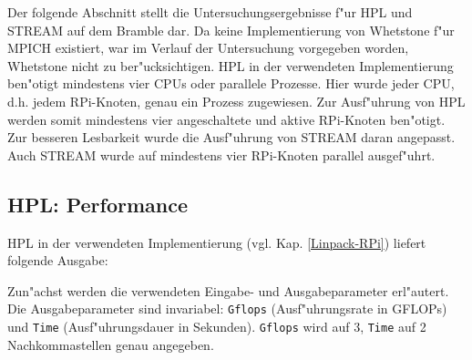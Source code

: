 {Der folgende Abschnitt stellt die Untersuchungsergebnisse f"ur HPL und STREAM auf dem Bramble dar. Da keine Implementierung von Whetstone f"ur MPICH existiert, war im Verlauf der Untersuchung vorgegeben worden, Whetstone nicht zu ber"ucksichtigen. HPL in der verwendeten Implementierung ben"otigt mindestens vier CPUs oder parallele Prozesse. Hier wurde jeder CPU, d.h. jedem RPi-Knoten, genau ein Prozess zugewiesen. Zur Ausf"uhrung von HPL werden somit mindestens vier angeschaltete und aktive RPi-Knoten ben"otigt. Zur besseren Lesbarkeit wurde die Ausf"uhrung von STREAM daran angepasst. Auch STREAM wurde auf mindestens vier RPi-Knoten parallel ausgef"uhrt. 

\subsection{HPL: Performance}\label{Ergebnisse-HPL}

HPL in der verwendeten Implementierung (vgl. Kap. \ref{Linpack-RPi}) liefert folgende Ausgabe:

Zun"achst werden die verwendeten Eingabe- und Ausgabeparameter erl"autert. Die Ausgabeparameter sind invariabel: \texttt{Gflops} (Ausf"uhrungsrate in GFLOPs) und \texttt{Time} (Ausf"uh\-rungsdauer in Sekunden). \texttt{Gflops} wird auf 3, \texttt{Time} auf 2 Nachkommastellen genau angegeben.

}
